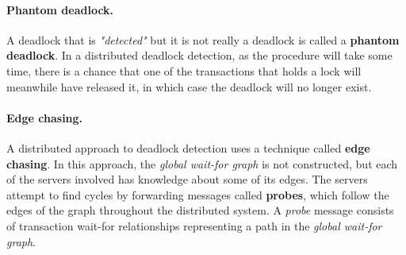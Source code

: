 \paragraph*{Phantom deadlock.} A deadlock that is \textit{"detected"} but it is not really a deadlock is called a \textbf{phantom deadlock}. In a distributed deadlock detection, as the procedure will take some time, there is a chance that one of the transactions that holds a lock will meanwhile have released it, in which case the deadlock will no longer exist.

\paragraph*{Edge chasing.} A distributed approach to deadlock detection uses a technique called \textbf{edge chasing}. In this approach, the \textit{global wait-for graph} is not constructed, but each of the servers involved has knowledge about some of its edges. The servers attempt to find cycles by forwarding messages called \textbf{probes}, which follow the edges of the graph throughout the distributed system. A \textit{probe} message consists of transaction wait-for relationships representing a path in the \textit{global wait-for graph}.


